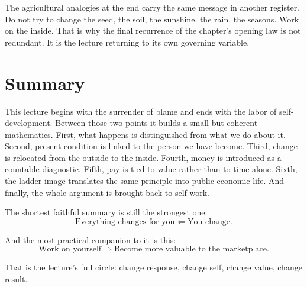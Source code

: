 The agricultural analogies at the end carry the same message in another register. Do not try to change the seed, the soil, the sunshine, the rain, the seasons. Work on the inside. That is why the final recurrence of the chapter's opening law is not redundant. It is the lecture returning to its own governing variable.

\section{Summary}

This lecture begins with the surrender of blame and ends with the labor of self-development. Between those two points it builds a small but coherent mathematics. First, what happens is distinguished from what we do about it. Second, present condition is linked to the person we have become. Third, change is relocated from the outside to the inside. Fourth, money is introduced as a countable diagnostic. Fifth, pay is tied to value rather than to time alone. Sixth, the ladder image translates the same principle into public economic life. And finally, the whole argument is brought back to self-work.

The shortest faithful summary is still the strongest one:
\begin{equation}
\text{Everything changes for you} \Longleftarrow \text{You change}.
\end{equation}

And the most practical companion to it is this:
\begin{equation}
\text{Work on yourself} \Longrightarrow \text{Become more valuable to the marketplace}.
\end{equation}

That is the lecture's full circle: change response, change self, change value, change result.